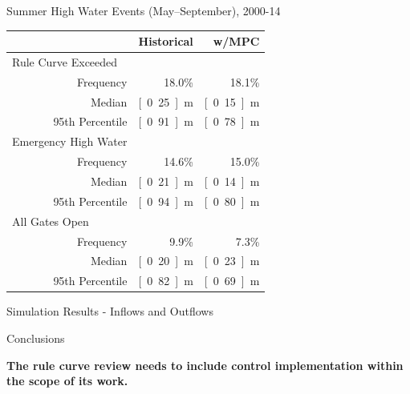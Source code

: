 \documentclass[compress,english]{beamer}
\begin{document}
{{{{{{\begin{frame}{Summer High Water Events (May--September), 2000-14}
\begin{center}	
\begin{tabular}{lrrr}\toprule
\qquad\qquad\qquad\quad & & Historical & w/MPC	\\
\midrule
\multicolumn{2}{l}{Rule Curve Exceeded} & & \\
& Frequency & 18.0\% & 18.1\% \\
& Median & \unit[0.25]{m} & \unit[0.15]{m}\\
& 95th Percentile & \unit[0.91]{m} & \unit[0.78]{m}\\
\midrule
\multicolumn{2}{l}{Emergency High Water} & & \\
& Frequency & 14.6\% & 15.0\%\\
& Median & \unit[0.21]{m} & \unit[0.14]{m} \\
& 95th Percentile & \unit[0.94]{m} & \unit[0.80]{m} \\
\midrule
\multicolumn{2}{l}{All Gates Open} & &\\
& Frequency & 9.9\% & 7.3\% \\
& Median & \unit[0.20]{m} & \unit[0.23]{m}\\
& 95th Percentile & \unit[0.82]{m} & \unit[0.69]{m} \\
\midrule
\end{tabular}
\end{center}

\vspace*{3mm}
\vfill

\end{frame}

\begin{frame}{Simulation Results - Inflows and Outflows}

\vfill
\centering
{}
\vfill

\end{frame}


\begin{frame}{Conclusions}

{\bf The rule curve review needs to include control implementation within the scope of its work.}


\end{frame}}}}}}}
\end{document}
